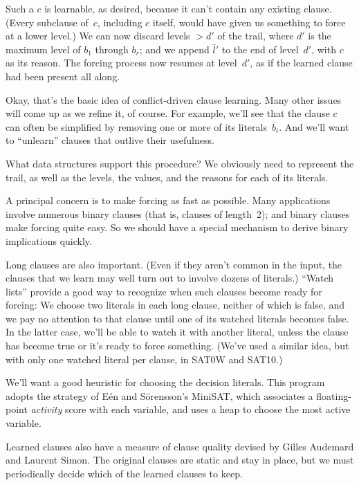Such a $c$ is learnable, as desired, because it can't contain any
existing clause. (Every subclause of~$c$, including $c$ itself,
would have given us something to
force at a lower level.) We can now discard levels $>d'$ of the trail, where
$d'$ is the maximum level of $b_1$ through $b_r$; and we append
$\bar l'$ to the end of level~$d'$, with $c$ as its reason.
The forcing process now resumes at level~$d'$, as if the learned
clause had been present all along.

Okay, that's the basic idea of conflict-driven clause learning.
Many other issues will come up as we refine it, of course. For example,
we'll see that the clause $c$ can often be simplified by removing
one or more of its literals~$\bar b_i$. And we'll want to ``unlearn'' clauses
that outlive their usefulness.

\fi

What data structures support this procedure? We obviously
need to
represent the trail, as well as the levels, the values, and the reasons for
each of its literals.

A principal concern is to make forcing as fast as possible. Many
applications involve numerous binary clauses (that is, clauses of length~2);
and binary clauses make forcing quite easy. So we should have a
special mechanism to derive binary implications quickly.

Long clauses are also important. (Even if they aren't common in the input,
the clauses that we learn may well turn out to involve dozens of literals.)
``Watch lists'' provide a good way to recognize when such clauses
become ready for forcing: We choose two literals in each long clause,
neither of which is false, and we pay no attention to that clause until one of
its watched literals becomes false. In the latter case, we'll be able to
watch it with another literal, unless the clause has become true or it's ready
to force something. (We've used a similar idea, but with only one watched
literal per clause, in {\mc SAT0W} and {\mc SAT10}.)

We'll want a good heuristic for choosing the decision literals.
This program adopts the strategy of E\'en and S\"orensson's
MiniSAT, which associates a floating-point {\it activity\/}
score with each variable, and uses a heap to choose the most
active variable.

Learned clauses also have a measure of clause quality devised by Gilles
Audemard
and Laurent Simon. The original clauses are static and stay in place,
but we must periodically decide which of the learned clauses to keep.

